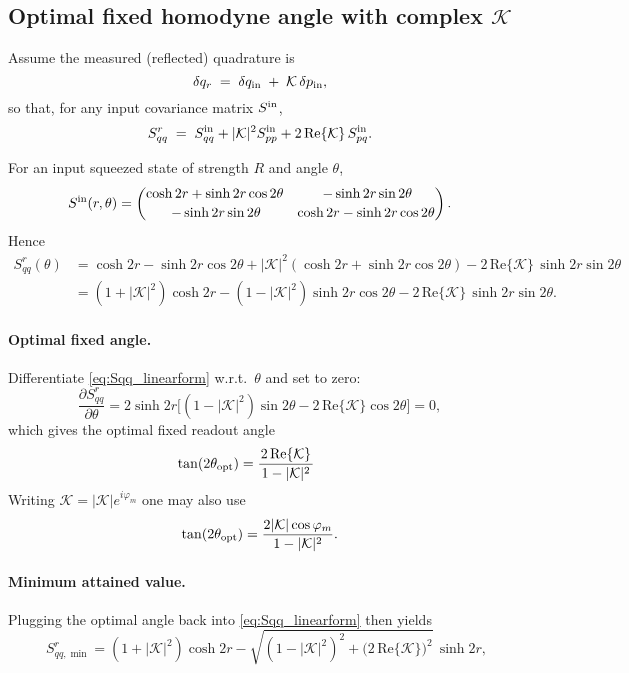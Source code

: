 \subsection*{Optimal fixed homodyne angle with complex \texorpdfstring{$\mathcal{K}$}{K}}

Assume the measured (reflected) quadrature is
\[
\delta q_r \;=\; \delta q_{\rm in} \;+\; \mathcal{K}\,\delta p_{\rm in},
\]
so that, for any input covariance matrix \(S^{\rm in}\),
\[
S^{r}_{qq} \;=\; S^{\rm in}_{qq} + |\mathcal{K}|^{2}S^{\rm in}_{pp} + 2\,\mathrm{Re}\{\mathcal{K}\}\,S^{\rm in}_{pq}.
\]

For an input squeezed state of strength \(R\) and angle \(\theta\),
\[
S^{\rm in}(r,\theta)=
\begin{pmatrix}
\cosh 2r + \sinh 2r \cos 2\theta & \,-\sinh 2r \sin 2\theta\\[2pt]
\,-\sinh 2r \sin 2\theta & \cosh 2r - \sinh 2r \cos 2\theta
\end{pmatrix}.
\]
Hence
\begin{align}
S^{r}_{qq}(\theta)
&= \cosh 2r - \sinh 2r \cos 2\theta
 + |\mathcal{K}|^{2}\!\left(\cosh 2r + \sinh 2r \cos 2\theta\right)
 - 2\,\mathrm{Re}\{\mathcal{K}\}\,\sinh 2r \sin 2\theta \nonumber\\[2pt]
&= (1+|\mathcal{K}|^{2})\cosh 2r
  - (1-|\mathcal{K}|^{2})\sinh 2r \cos 2\theta
  - 2\,\mathrm{Re}\{\mathcal{K}\}\,\sinh 2r \sin 2\theta .
\label{eq:Sqq_linearform}
\end{align}

\paragraph{Optimal fixed angle.}
Differentiate \eqref{eq:Sqq_linearform} w.r.t.~\(\theta\) and set to zero:
\[
\frac{\partial S^{r}_{qq}}{\partial \theta}
= 2\sinh 2r\Big[(1-|\mathcal{K}|^{2})\sin 2\theta - 2\,\mathrm{Re}\{\mathcal{K}\}\cos 2\theta\Big]=0,
\]
which gives the optimal fixed readout angle
\begin{equation}
\tan(2\theta_{\rm opt})
=  \frac{2\,\mathrm{Re}\{\mathcal{K}\}}{\,1-|\mathcal{K}|^{2}\,}
\qquad
\label{eq:theta_opt}
\end{equation}
Writing \(\mathcal{K}=|\mathcal{K}|e^{i\varphi_m}\) one may also use
\[
\tan(2\theta_{\rm opt})=\frac{2|\mathcal{K}|\cos\varphi_m}{\,1-|\mathcal{K}|^{2}\,}.
\]

\paragraph{Minimum attained value.}
Plugging the optimal angle back into \eqref{eq:Sqq_linearform} then yields
\begin{equation}
\quad
S^{r}_{qq,\min}
=(1+|\mathcal{K}|^{2})\cosh 2r - \sqrt{(1-|\mathcal{K}|^{2})^{2}+\big(2\,\mathrm{Re}\{\mathcal{K}\}\big)^{2}}\,\sinh 2r,
\label{eq:Smin_general}
\end{equation}

